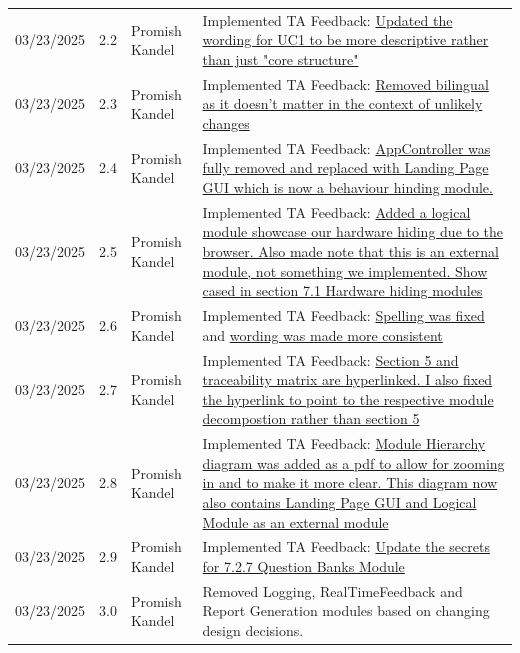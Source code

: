 \documentclass[12pt, titlepage]{article}
\begin{document}
\begin{tabularx}{\textwidth}{p{3cm}p{2cm}p{3cm}X}
  03/23/2025 & 2.2 & Promish Kandel & Implemented TA Feedback: \href{https://github.com/parishanizam/TeleHealth/issues/500}{Updated the wording for UC1 to be more descriptive rather than just "core structure"}\\
  03/23/2025 & 2.3 & Promish Kandel & Implemented TA Feedback: \href{https://github.com/parishanizam/TeleHealth/issues/501}{Removed bilingual as it doesn't matter in the context of unlikely changes}\\
  03/23/2025 & 2.4 & Promish Kandel & Implemented TA Feedback: \href{https://github.com/parishanizam/TeleHealth/issues/502}{AppController was fully removed and replaced with Landing Page GUI which is now a behaviour hinding module.}\\
  03/23/2025 & 2.5 & Promish Kandel & Implemented TA Feedback: \href{https://github.com/parishanizam/TeleHealth/issues/504}{Added a logical module showcase our hardware hiding due to the browser. Also made note that this is an external module, not something we implemented. Show cased in section 7.1 Hardware hiding modules}\\
  03/23/2025 & 2.6 & Promish Kandel & Implemented TA Feedback: \href{https://github.com/parishanizam/TeleHealth/issues/505}{Spelling was fixed} and \href{https://github.com/parishanizam/TeleHealth/issues/506}{wording was made more consistent}\\
  03/23/2025 & 2.7 & Promish Kandel & Implemented TA Feedback: \href{https://github.com/parishanizam/TeleHealth/issues/507}{Section 5 and traceability matrix are hyperlinked. I also fixed the hyperlink to point to the respective module decompostion rather than section 5}\\
  03/23/2025 & 2.8 & Promish Kandel & Implemented TA Feedback: \href{https://github.com/parishanizam/TeleHealth/issues/508}{Module Hierarchy diagram was added as a pdf to allow for zooming in and to make it more clear. This diagram now also contains Landing Page GUI and Logical Module as an external module}\\
  03/23/2025 & 2.9 & Promish Kandel & Implemented TA Feedback: \href{https://github.com/parishanizam/TeleHealth/issues/338}{Update the secrets for 7.2.7 Question Banks Module }\\
  03/23/2025 & 3.0 & Promish Kandel & Removed Logging, RealTimeFeedback and Report Generation modules based on changing design decisions.\\


  \bottomrule
\end{tabularx}
\end{document}
